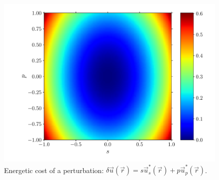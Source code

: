 \documentclass[fleqn]{goose-article}
\begin{document}
\begin{figure}[htp]
    \centering
    \includegraphics[width=.5\textwidth]{phase-diagram_energy.pdf}
    \caption{
        Energetic cost of a perturbation:
        $\delta \vec{u}(\vec{r}) = s \vec{u}^*_s (\vec{r}) + p \vec{u}^*_p (\vec{r})$.
    }
    \label{fig:energy}
\end{figure}
\end{document}
